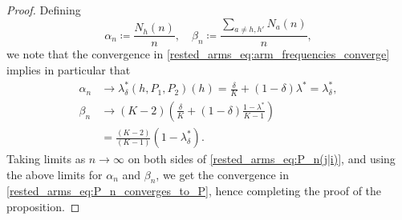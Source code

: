 \begin{proof}
Defining
\begin{equation}
	\alpha_n\coloneqq\frac{N_h(n)}{n},\quad \beta_n\coloneqq\frac{\sum\limits_{a\neq h,h'}N_a(n)}{n},\label{rested_arms_eq:alpha_n_beta_n}
\end{equation}
we note that the convergence in \eqref{rested_arms_eq:arm_frequencies_converge} implies in particular that
\begingroup\allowdisplaybreaks\begin{align}
	\alpha_n &\to \lambda^*_\delta(h,P_1,P_2)(h)=\frac{\delta}{K}+(1-\delta)\lambda^*=\lambda_\delta^*,\nonumber\\
	\beta_n &\to (K-2)\left(\frac{\delta}{K}+(1-\delta)\frac{1-\lambda^*}{K-1}\right)\nonumber\\
	&=\frac{(K-2)}{(K-1)}(1-\lambda_\delta^*).\label{rested_arms_eq:alpha_n_beta_n_convergence}
\end{align}\endgroup
Taking limits as $n\to\infty$ on both sides of \eqref{rested_arms_eq:P_n(j|i)}, and using the above limits for $\alpha_n$ and $\beta_n$,  we get the convergence in \eqref{rested_arms_eq:P_n_converges_to_P}, hence completing the proof of the proposition.
\end{proof}

